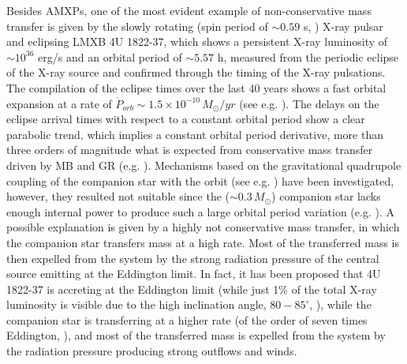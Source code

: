 \documentclass[graybox]{svmult}
\begin{document}
Besides AMXPs, one of the most evident example of non-conservative mass transfer is given by the slowly rotating (spin period of $\sim 0.59$ s, \cite{Jonker2001}) X-ray pulsar and eclipsing LMXB 4U 1822-37, which shows a persistent X-ray luminosity of $\sim 10^{36}$ erg/s and an orbital period of $\sim 5.57$ h, measured from the periodic eclipse of the X-ray source and confirmed through the timing of the X-ray pulsations. The compilation of the eclipse times over the last 40 years shows a fast orbital expansion at a rate of $\dot P_{orb} \sim 1.5 \times 10^{-10}\, M_\odot/yr$ (see e.g. \cite{Chou2016,Mazzola2019}). The delays on the eclipse arrival times with respect to a constant orbital period show a clear parabolic trend, which implies a constant orbital period derivative, more than three orders of magnitude what is expected from conservative mass transfer driven by MB and GR (e.g. \cite{Burderi2010,Iaria2011}). Mechanisms based on the gravitational quadrupole coupling of the companion star with the orbit (see e.g. \cite{Applegate1992,Applegate1994}) have been investigated, however, they resulted not suitable since the ($\sim 0.3\, M_\odot$) companion star lacks enough internal power to produce such a large orbital period variation (e.g. \cite{Mazzola2019}). 
%
A possible explanation is given by a highly not conservative mass transfer, in which the companion star transfers mass at a high rate. Most of the transferred mass is then expelled from the system by the strong radiation pressure of the central source emitting at the Eddington limit. In fact, it has been proposed that 4U 1822-37 is accreting at the Eddington limit (while just 1\% of the total X-ray luminosity is visible due to the high inclination angle, $80-85^\circ$, \cite{Iaria2011}), while the companion star is transferring at a higher rate (of the order of seven times Eddington, \cite{Burderi2010}), and most of the transferred mass is expelled from the system by the radiation pressure producing strong outflows and winds. 
\end{document}
